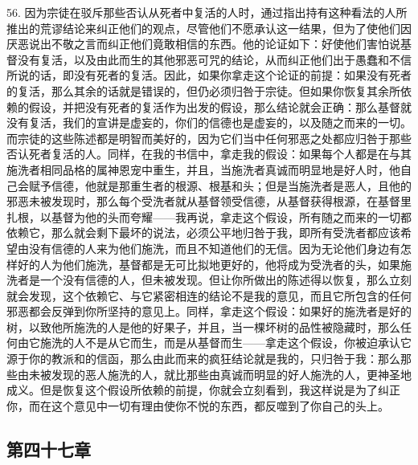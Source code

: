 56. 因为宗徒在驳斥那些否认从死者中复活的人时，通过指出持有这种看法的人所推出的荒谬结论来纠正他们的观点，尽管他们不愿承认这一结果，但为了使他们因厌恶说出不敬之言而纠正他们竟敢相信的东西。他的论证如下：好使他们害怕说基督没有复活，以及由此而生的其他邪恶可咒的结论，从而纠正他们出于愚蠢和不信所说的话，即没有死者的复活。因此，如果你拿走这个论证的前提：如果没有死者的复活，那么其余的话就是错误的，但仍必须归咎于宗徒。但如果你恢复其余所依赖的假设，并把没有死者的复活作为出发的假设，那么结论就会正确：那么基督就没有复活，我们的宣讲是虚妄的，你们的信德也是虚妄的，以及随之而来的一切。而宗徒的这些陈述都是明智而美好的，因为它们当中任何邪恶之处都应归咎于那些否认死者复活的人。同样，在我的书信中，拿走我的假设：如果每个人都是在与其施洗者相同品格的属神恩宠中重生，并且，当施洗者真诚而明显地是好人时，他自己会赋予信德，他就是那重生者的根源、根基和头；但是当施洗者是恶人，且他的邪恶未被发现时，那么每个受洗者就从基督领受信德，从基督获得根源，在基督里扎根，以基督为他的头而夸耀——我再说，拿走这个假设，所有随之而来的一切都依赖它，那么就会剩下最坏的说法，必须公平地归咎于我，即所有受洗者都应该希望由没有信德的人来为他们施洗，而且不知道他们的无信。因为无论他们身边有怎样好的人为他们施洗，基督都是无可比拟地更好的，他将成为受洗者的头，如果施洗者是一个没有信德的人，但未被发现。但让你所做出的陈述得以恢复，那么立刻就会发现，这个依赖它、与它紧密相连的结论不是我的意见，而且它所包含的任何邪恶都会反弹到你所坚持的意见上。同样，拿走这个假设：如果好的施洗者是好的树，以致他所施洗的人是他的好果子，并且，当一棵坏树的品性被隐藏时，那么任何由它施洗的人不是从它而生，而是从基督而生——拿走这个假设，你被迫承认它源于你的教派和的信函，那么由此而来的疯狂结论就是我的，只归咎于我：那么那些由未被发现的恶人施洗的人，就比那些由真诚而明显的好人施洗的人，更神圣地成义。但是恢复这个假设所依赖的前提，你就会立刻看到，我这样说是为了纠正你，而在这个意见中一切有理由使你不悦的东西，都反噬到了你自己的头上。\par


\subsection{第四十七章}

